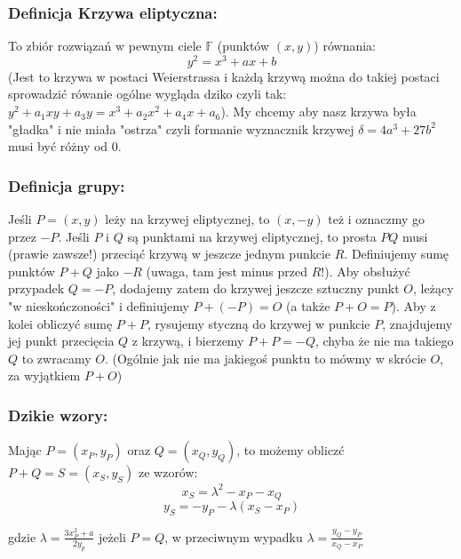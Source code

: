 \subsubsection{Definicja Krzywa eliptyczna:}
To zbiór rozwiązań w pewnym ciele $\mathbb{F}$ (punktów $(x,y)$) równania:
$$y^2 = x^3 + ax + b$$
(Jest to krzywa w postaci Weierstrassa i każdą krzywą można do takiej postaci sprowadzić rówanie ogólne wygląda dziko czyli tak: $y^2 + a_1xy + a_3y = x^3 + a_2x^2 + a_4x + a_6$).
\newline \newline
My chcemy aby nasz krzywa była "gładka" i nie miała "ostrza" czyli formanie wyznacznik krzywej $\delta = 4a^3 + 27b^2$ musi być różny od 0.

\subsubsection{Definicja grupy:}
Jeśli $P = (x, y)$ leży na krzywej eliptycznej, to $(x, -y)$ też i oznaczmy go przez $-P$. Jeśli $P$ i $Q$ są punktami na krzywej eliptycznej, to prosta $PQ$ musi
(prawie zawsze!) przeciąć krzywą w jeszcze jednym punkcie $R$.
Definiujemy sumę punktów $P + Q$ jako $-R$ (uwaga, tam jest minus przed $R$!). Aby obsłużyć przypadek $Q = -P$, dodajemy zatem do krzywej jeszcze sztuczny punkt $O$, leżący "w nieskończoności" i
definiujemy $P + (-P) = O$ (a także $P + O = P$). Aby z kolei obliczyć sumę $P + P$, rysujemy styczną do krzywej w
punkcie $P$, znajdujemy jej punkt przecięcia $Q$ z krzywą, i bierzemy $P + P = -Q$, chyba że nie ma takiego $Q$ to zwracamy $O$. (Ogólnie jak nie ma jakiegoś punktu to mówmy w skrócie $O$, za wyjątkiem $P+O$)

\subsubsection{Dzikie wzory:}
Mając $P = (x_P, y_P)$ oraz $Q = (x_Q, y_Q)$, to możemy obliczć $P + Q = S = (x_S , y_S )$ ze wzorów:
$$x_S = \lambda^2 - x_P - x_Q$$
$$y_S = -y_P - \lambda(x_S - x_P)$$

gdzie $\lambda = \frac{3x_{P}^2 +a }{2y_p}$ jeżeli $P = Q$, w przeciwnym wypadku $\lambda = \frac{y_Q - y_P}{x_Q - x_P}$